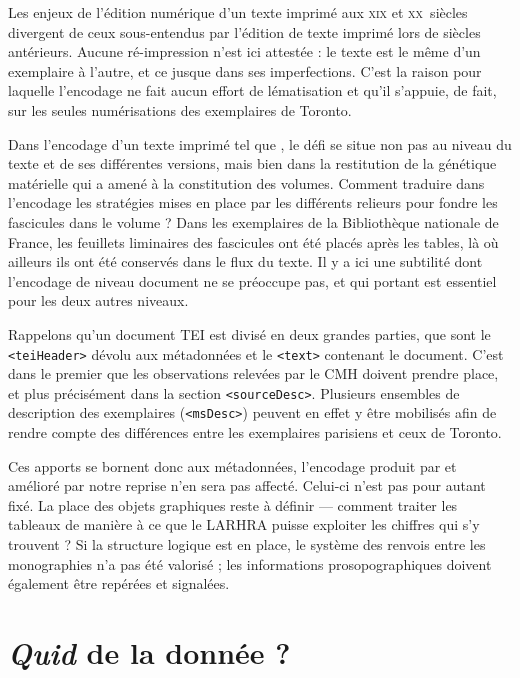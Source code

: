 Les enjeux de l'édition numérique d'un texte imprimé aux \textsc{xix}\ieme{} et \textsc{xx}\ieme~siècles divergent de ceux sous-entendus par l'édition de texte imprimé lors de siècles antérieurs. Aucune ré-impression n'est ici attestée : le texte est le même d'un exemplaire à l'autre, et ce jusque dans ses imperfections. C'est la raison pour laquelle l'encodage ne fait aucun effort de lématisation et qu'il s'appuie, de fait, sur les seules numérisations des exemplaires de Toronto.

Dans l'encodage d'un texte imprimé tel que \lodm{}, le défi se situe non pas au niveau du texte et de ses différentes versions, mais bien dans la restitution de la génétique matérielle qui a amené à la constitution des volumes. Comment traduire dans l'encodage les stratégies mises en place par les différents relieurs pour fondre les fascicules dans le volume ? Dans les exemplaires de la Bibliothèque nationale de France, les feuillets liminaires des fascicules ont été placés après les tables, là où ailleurs ils ont été conservés dans le flux du texte. Il y a ici une subtilité dont l'encodage de niveau \og document \fg{} ne se préoccupe pas, et qui portant est essentiel pour les deux autres niveaux.

Rappelons qu'un document TEI est divisé en deux grandes parties, que sont le \texttt{<teiHeader>} dévolu aux métadonnées et le \texttt{<text>} contenant le document. C'est dans le premier que les observations relevées par le CMH doivent prendre place, et plus précisément dans la section \texttt{<sourceDesc>}. Plusieurs ensembles de description des exemplaires (\texttt{<msDesc>}) peuvent en effet y être mobilisés afin de rendre compte des différences entre les exemplaires parisiens et ceux de Toronto.

Ces apports se bornent donc aux métadonnées, l'encodage produit par \lse{} et amélioré par notre reprise n'en sera pas affecté. Celui-ci n'est pas pour autant fixé. La place des objets graphiques reste à définir --- comment traiter les tableaux de manière à ce que le LARHRA puisse exploiter les chiffres qui s'y trouvent ? Si la structure logique est en place, le système des renvois entre les monographies n'a pas été valorisé ; les informations prosopographiques doivent également être repérées et signalées.

\section{\textit{Quid} de la donnée ?}

